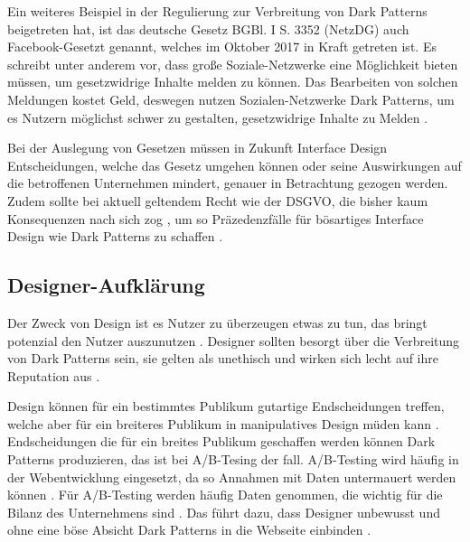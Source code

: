 \documentclass[conference,compsoc,final,a4paper]{IEEEtran}
\begin{document}
Ein weiteres Beispiel in der Regulierung zur Verbreitung von Dark Patterns beigetreten hat, ist das deutsche Gesetz BGBl. I S. 3352 (\ac{NetzDG}) auch Facebook-Gesetzt genannt, welches im Oktober 2017 in Kraft getreten ist. Es schreibt unter anderem vor, dass große Soziale-Netzwerke eine Möglichkeit bieten müssen, um gesetzwidrige Inhalte melden zu können. Das Bearbeiten von solchen Meldungen kostet Geld, deswegen nutzen Sozialen-Netzwerke Dark Patterns, um es Nutzern möglichst schwer zu gestalten, gesetzwidrige Inhalte zu Melden \autocite{Rieger2020}.


Bei der Auslegung von Gesetzen müssen in Zukunft Interface Design Entscheidungen, welche das Gesetz umgehen können oder seine Auswirkungen auf die betroffenen Unternehmen mindert, genauer in Betrachtung gezogen werden. Zudem sollte bei aktuell geltendem Recht wie der \ac{DSGVO}, die bisher kaum Konsequenzen nach sich zog \autocite{Nouwens2020}, um so Präzedenzfälle für bösartiges Interface Design wie Dark Patterns zu schaffen \autocite{Rieger2020}.

\subsection{Designer-Aufklärung}
Der Zweck von Design ist es Nutzer zu überzeugen etwas zu tun, das bringt potenzial den Nutzer auszunutzen \autocites{OinasKukkonen2009}{Sengers2005}. Designer sollten besorgt über die Verbreitung von Dark Patterns sein, sie gelten als unethisch und wirken sich lecht auf ihre Reputation aus \autocite{Narayanan2020}.

Design können für ein bestimmtes Publikum gutartige Endscheidungen treffen, welche aber für ein breiteres Publikum in manipulatives Design müden kann \autocite{Gray_2018}. Endscheidungen die für ein breites Publikum geschaffen werden können Dark Patterns produzieren, das ist bei A/B-Tesing der fall. A/B-Testing wird häufig in der Webentwicklung eingesetzt, da so Annahmen mit Daten untermauert werden können \autocite{Kohavi2017}. Für A/B-Testing werden häufig Daten genommen, die wichtig für die Bilanz des Unternehmens sind \autocites{Kohavi2017}{Narayanan2020}. Das führt dazu, dass Designer unbewusst und ohne eine böse Absicht Dark Patterns in die Webseite einbinden \autocite{Narayanan2020}.
\end{document}
